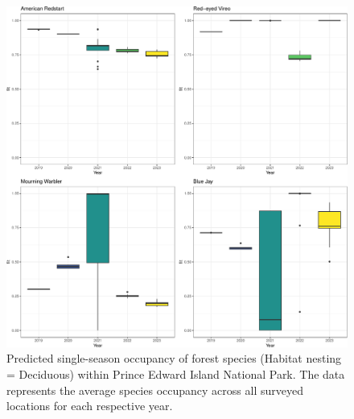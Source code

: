 \documentclass[
  letterpaper,
  DIV=11,
  numbers=noendperiod,
  oneside]{scrartcl}
\begin{document}
\begin{figure}

{\centering \includegraphics{peinp_files/figure-pdf/fig-spp-occ-decid-1.pdf}

}

\caption{\label{fig-spp-occ-decid}Predicted single-season occupancy of
forest species (Habitat nesting = Deciduous) within Prince Edward Island
National Park. The data represents the average species occupancy across
all surveyed locations for each respective year.}

\end{figure}
\end{document}
